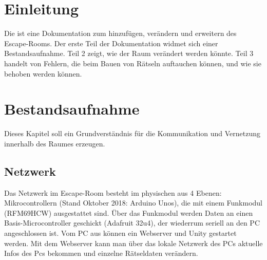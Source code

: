 \documentclass[12pt]{article} %
\begin{document}

\tableofcontents %

\newpage %


\section{Einleitung} %

Die ist eine Dokumentation zum hinzufügen, verändern und erweitern des Escape-Rooms. 
Der erste Teil der Dokumentation widmet sich einer Bestandsaufnahme. 
Teil 2 zeigt, wie der Raum verändert werden könnte. 
Teil 3 handelt von Fehlern, die beim Bauen von Rätseln auftauchen können, und wie sie behoben werden können.



\section{Bestandsaufnahme} %

Dieses Kapitel soll ein Grundverständnis für die Kommunikation und Vernetzung innerhalb des Raumes erzeugen.


\subsection{Netzwerk} %

Das Netzwerk im Escape-Room besteht im physischen aus 4 Ebenen: \\
Mikrocontrollern (Stand Oktober 2018: Arduino Unos), die mit einem Funkmodul (RFM69HCW) ausgestattet sind.
Über das Funkmodul werden Daten an einen Basis-Microcontroller geschickt (Adafruit 32u4), der wiederrum seriell an den PC angeschlossen ist. 
Vom PC aus können ein Webserver und Unity gestartet werden. 
Mit dem Webserver kann man über das lokale Netzwerk des PCs aktuelle Infos des Pcs bekommen und einzelne Rätseldaten verändern.
\end{document}
